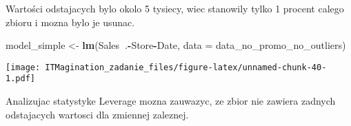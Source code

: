 \documentclass[]{article}
\newenvironment{Shaded}{\begin{snugshade}}{\end{snugshade}}
\newcommand{\DataTypeTok}[1]{\textcolor[rgb]{0.13,0.29,0.53}{#1}}
\newcommand{\DecValTok}[1]{\textcolor[rgb]{0.00,0.00,0.81}{#1}}
\newcommand{\KeywordTok}[1]{\textcolor[rgb]{0.13,0.29,0.53}{\textbf{#1}}}
\newcommand{\NormalTok}[1]{#1}
\newcommand{\OperatorTok}[1]{\textcolor[rgb]{0.81,0.36,0.00}{\textbf{#1}}}
\newcommand{\StringTok}[1]{\textcolor[rgb]{0.31,0.60,0.02}{#1}}
\begin{document}
\begin{Shaded}
\end{Shaded}

Wartości odstajacych bylo okolo 5 tysiecy, wiec stanowily tylko 1
procent calego zbioru i mozna bylo je usunac.

\begin{Shaded}
\begin{Highlighting}[]
\NormalTok{model_simple <-}\StringTok{ }\KeywordTok{lm}\NormalTok{(Sales}\OperatorTok{~}\NormalTok{.}\OperatorTok{-}\NormalTok{Store}\OperatorTok{-}\NormalTok{Date, }\DataTypeTok{data =}\NormalTok{ data_no_promo_no_outliers)}
\end{Highlighting}
\end{Shaded}

\begin{Shaded}
\end{Shaded}

\texttt{[image: ITMagination\_zadanie\_files/figure-latex/unnamed-chunk-40-1.pdf]}

Analizujac statystyke Leverage mozna zauwazyc, ze zbior nie zawiera
zadnych odstajacych wartosci dla zmiennej zaleznej.

\begin{Shaded}
\end{Shaded}
\end{document}
